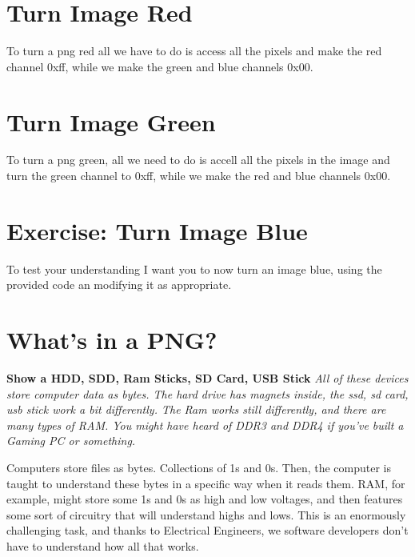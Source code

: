 \documentclass[12pt]{article}
\begin{document}


\section{Turn Image Red}

To turn a png red all we have to do is access all the pixels and make the red channel 0xff, while we make the green and blue channels 0x00.



\section{Turn Image Green}

To turn a png green, all we need to do is accell all the pixels in the image and turn the green channel to 0xff, while we make the red and blue channels 0x00.



\section{Exercise: Turn Image Blue}

To test your understanding I want you to now turn an image blue, using the provided code an modifying it as appropriate.

\section{What's in a PNG?}
\begin{center}
\textbf{Show a HDD, SDD, Ram Sticks, SD Card, USB Stick}
\textit{All of these devices store computer data as bytes. The hard drive has magnets inside, the ssd, sd card, usb stick work a bit differently. The Ram works still differently, and there are many types of RAM. You might have heard of DDR3 and DDR4 if you've built a Gaming PC or something.}
\end{center}

Computers store files as bytes. Collections of 1s and 0s. Then, the computer is taught to understand these bytes in a specific way when it reads them. RAM, for example, might store some 1s and 0s as high and low voltages, and then features some sort of circuitry that will understand highs and lows. This is an enormously challenging task, and thanks to Electrical Engineers, we software developers don't have to understand how all that works.
\end{document}

